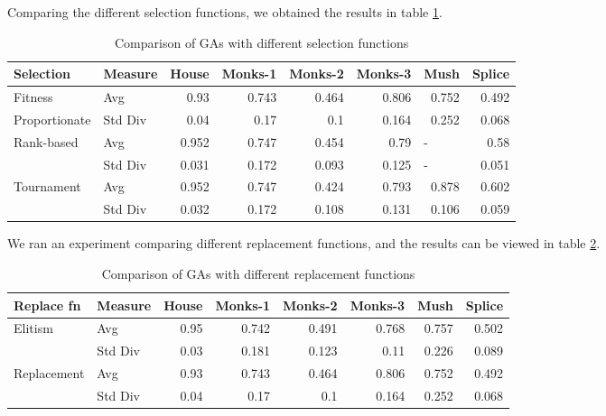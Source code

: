 \documentclass[12pt, letterpaper]{article}
\begin{document}
Comparing the different selection functions, we obtained the results in table \ref{tab:selection}.

\begin{table}[htbp]
\caption{Comparison of GAs with different selection functions}
\begin{center}
\begin{tabular}{|l|l|r|r|r|r|r|r|}
\hline
\textbf{Selection} & \textbf{Measure} & \multicolumn{1}{l|}{\textbf{House}} & \multicolumn{1}{l|}{\textbf{Monks-1}} & \multicolumn{1}{l|}{\textbf{Monks-2}} & \multicolumn{1}{l|}{\textbf{Monks-3}} & \multicolumn{1}{l|}{\textbf{Mush}} & \multicolumn{1}{l|}{\textbf{Splice}} \\ \hline
Fitness & Avg & 0.93 & 0.743 & 0.464 & 0.806 & 0.752 & 0.492 \\ \cline{2-8}
Proportionate & Std Div & 0.04 & 0.17 & 0.1 & 0.164 & 0.252 & 0.068 \\ \hline
Rank-based & Avg & 0.952 & 0.747 & 0.454 & 0.79 & \multicolumn{1}{l|}{-} & 0.58 \\ \cline{2-8}
 & Std Div & 0.031 & 0.172 & 0.093 & 0.125 & \multicolumn{1}{l|}{-} & 0.051 \\ \hline
 Tournament & Avg & 0.952 & 0.747 & 0.424 & 0.793 & 0.878 & 0.602 \\ \cline{2-8}
 & Std Div & 0.032 & 0.172 & 0.108 & 0.131 & 0.106 & 0.059 \\ \hline
\end{tabular}
\end{center}
\label{tab:selection}
\end{table}

We ran an experiment comparing different replacement functions, and the results can be viewed in table \ref{tab:replacement}.

\begin{table}[htbp]
\caption{Comparison of GAs with different replacement functions}
\begin{center}
\begin{tabular}{|l|l|r|r|r|r|r|r|}
\hline
\textbf{Replace fn} & \textbf{Measure} & \multicolumn{1}{l|}{\textbf{House}} & \multicolumn{1}{l|}{\textbf{Monks-1}} & \multicolumn{1}{l|}{\textbf{Monks-2}} & \multicolumn{1}{l|}{\textbf{Monks-3}} & \multicolumn{1}{l|}{\textbf{Mush}} & \multicolumn{1}{l|}{\textbf{Splice}} \\ \hline
Elitism & Avg & 0.95 & 0.742 & 0.491 & 0.768 & 0.757 & 0.502 \\ \cline{2-8}
 & Std Div & 0.03 & 0.181 & 0.123 & 0.11 & 0.226 & 0.089 \\ \hline
 Replacement & Avg & 0.93 & 0.743 & 0.464 & 0.806 & 0.752 & 0.492 \\ \cline{2-8}
 & Std Div & 0.04 & 0.17 & 0.1 & 0.164 & 0.252 & 0.068 \\ \hline
\end{tabular}
\end{center}
\label{tab:replacement}
\end{table}
\end{document}
